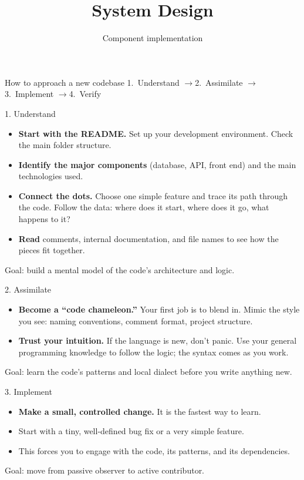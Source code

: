 \documentclass[aspectratio=169]{beamer}
\title{System Design}
\subtitle{Component implementation}
\begin{document}
\maketitle

\begin{frame}{How to approach a new codebase}
  \centering
  \large
  \mbox{1.\ Understand} \quad$\rightarrow$\quad \mbox{2.\ Assimilate} \quad$\rightarrow$\quad
  \mbox{3.\ Implement} \quad$\rightarrow$\quad \mbox{4.\ Verify}
\end{frame}

\begin{frame}{1. Understand}
  \begin{itemize}
    \item \textbf{Start with the README.} Set up your development environment. Check the main
      folder structure.
    \item \textbf{Identify the major components} (database, API, front end) and the main
      technologies used.
    \item \textbf{Connect the dots.} Choose one simple feature and trace its path through the
      code. Follow the data: where does it start, where does it go, what happens to it?
    \item \textbf{Read} comments, internal documentation, and file names to see how the
      pieces fit together.
  \end{itemize}
  \alert{Goal:} build a mental model of the code's architecture and logic.
\end{frame}

\begin{frame}{2. Assimilate}
  \begin{itemize}
    \item \textbf{Become a ``code chameleon.''} Your first job is to blend in. Mimic the
      style you see: naming conventions, comment format, project structure.
    \item \textbf{Trust your intuition.} If the language is new, don't panic. Use your
      general programming knowledge to follow the logic; the syntax comes as you work.
  \end{itemize}
  \alert{Goal:} learn the code's patterns and local dialect before you write anything new.
\end{frame}

\begin{frame}{3. Implement}
  \begin{itemize}
    \item \textbf{Make a small, controlled change.} It is the fastest way to learn.
    \item Start with a tiny, well-defined bug fix or a very simple feature.
    \item This forces you to engage with the code, its patterns, and its dependencies.
  \end{itemize}
  \alert{Goal:} move from passive observer to active contributor.
\end{frame}
\end{document}
